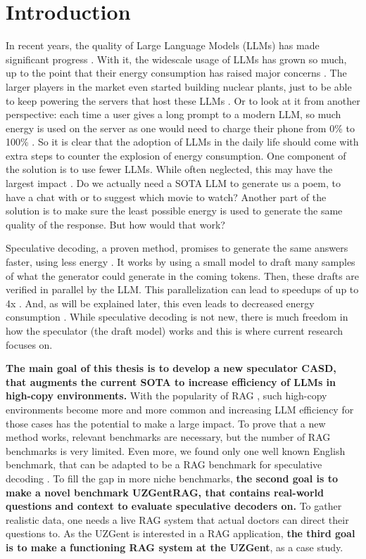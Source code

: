 \chapter{Introduction}
In recent years, the quality of Large Language Models (LLMs) has made significant progress \cite{zhao2023survey}. With it, the widescale usage of LLMs has grown so much, up to the point that their energy consumption has raised major concerns \cite{alizadeh2024analyzing, bender2021dangers, strubell2020energy}. The larger players in the market even started building nuclear plants, just to be able to keep powering the servers that host these LLMs \cite{luscombe2024three, wnn2025facebook, bbc2025ai}. Or to look at it from another perspective: each time a user gives a long prompt to a modern LLM, so much energy is used on the server as one would need to charge their phone from 0\% to 100\% \cite{epoch2025energy}. So it is clear that the adoption of LLMs in the daily life should come with extra steps to counter the explosion of energy consumption. One component of the solution is to use fewer LLMs. While often neglected, this may have the largest impact \cite{alcott2005jevons}. Do we actually need a SOTA LLM to generate us a poem, to have a chat with or to suggest which movie to watch? Another part of the solution is to make sure the least possible energy is used to generate the same quality of the response. But how would that work?

Speculative decoding, a proven method, promises to generate the same answers faster, using less energy \cite{leviathan2023fast, qin2024optimized}. It works by using a small model to draft many samples of what the generator could generate in the coming tokens. Then, these drafts are verified in parallel by the LLM. This parallelization can lead to speedups of up to 4x \cite{li2024eagle}. And, as will be explained later, this even leads to decreased energy consumption \cite{qin2024optimized}. While speculative decoding is not new, there is much freedom in how the speculator (the draft model) works and this is where current research focuses on.

\textbf{The main goal of this thesis is to develop a new speculator CASD, that augments the current SOTA to increase efficiency of LLMs in high-copy environments.} With the popularity of RAG \cite{k2view2025GenAI, menlov2025state}, such high-copy environments become more and more common and increasing LLM efficiency for those cases has the potential to make a large impact. To prove that a new method works, relevant benchmarks are necessary, but the number of RAG benchmarks is very limited. Even more, we found only one well known English benchmark, that can be adapted to be a RAG benchmark for speculative decoding \cite{rajpurkar2016squad}. To fill the gap in more niche benchmarks, \textbf{the second goal is to make a novel benchmark UZGentRAG, that contains real-world questions and context to evaluate speculative decoders on.} To gather realistic data, one needs a live RAG system that actual doctors can direct their questions to. As the UZGent is interested in a RAG application, \textbf{the third goal is to make a functioning RAG system at the UZGent}, as a case study. 

